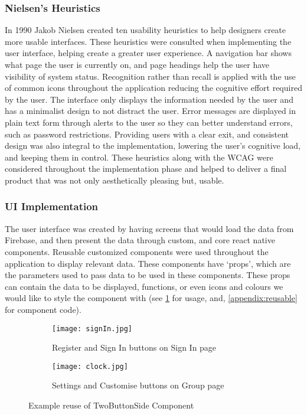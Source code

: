 \subsubsection{Nielsen's Heuristics }
In 1990 Jakob Nielsen created ten usability heuristics \cite{nielsen} to help designers create more usable interfaces. These heuristics were consulted when implementing the user interface, helping create a greater user experience. A navigation bar shows what page the user is currently on, and page headings help the user have visibility of system status. Recognition rather than recall is applied with the use of common icons throughout the application reducing the cognitive effort required by the user. The interface only displays the information needed by the user and has a minimalist design to not distract the user. Error messages are displayed in plain text form through alerts to the user so they can better understand errors, such as password restrictions. Providing users with a clear exit, and consistent design was also integral to the implementation, lowering the user's cognitive load, and keeping them in control. These heuristics along with the WCAG were considered throughout the implementation phase and helped to deliver a final product that was not only aesthetically pleasing but, usable.

\subsubsection{UI Implementation}
The user interface was created by having screens that would load the data from Firebase, and then present the data through custom, and core react native components. Reusable customized components were used throughout the application to display relevant data. These components have `props', which are the parameters used to pass data to be used in these components. These props can contain the data to be displayed, functions, or even icons and colours we would like to style the component with (see \ref{fig:reuseComp} for usage, and, \ref{appendix:reusable} for component code).


\begin{figure}[!htbp]
    \centering
    \begin{subfigure}[b]{0.25\textwidth}
        \texttt{[image: signIn.jpg]}
        \caption{Register and Sign In buttons on Sign In page}
    \end{subfigure}
    \hspace{1.5em}
    \begin{subfigure}[b]{0.25\textwidth}
        \texttt{[image: clock.jpg]}
        \caption{Settings and Customise buttons on Group page}
    \end{subfigure}
    \caption{Example reuse of TwoButtonSide Component}
    \label{fig:reuseComp}
\end{figure}
\FloatBarrier
